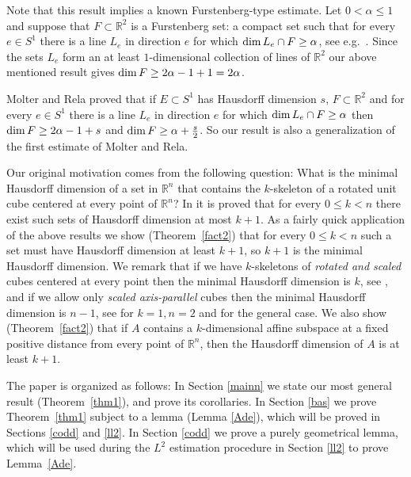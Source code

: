 \documentclass[a4paper]{amsart}
\theoremstyle{definition} \newtheorem{remark}[theorem]{Remark}
\def\rr{{\mathbb R}}
\def\R{{\mathbb R}}
\def\su{\subset}
\def\al{\alpha}
\def\dim{{\rm dim}\, }
\begin{document}
Note that this result implies a known Furstenberg-type estimate. 
Let $0 < \al \leq 1$ and suppose that $F \su \rr^2$ is a Furstenberg set: 
a compact set such that for
every $e \in S^1$ there is a line $L_e$ in direction $e$ for which 
$\dim L_e \cap F \geq \al$, see e.g.~\cite{Ma15}. 
Since the sets $L_e$ form an at least $1$-dimensional collection of lines of $\R^2$
our above mentioned result gives $\dim F \geq 2 \al - 1 + 1= 2 \al$.

Molter and Rela \cite{MR} proved that if $E\su S^1$
has Hausdorff dimension $s$,  
$F\su\R^2$ and for every $e\in S^1$ there is a line 
$L_e$ in direction $e$ for which 
$\dim L_e \cap F \geq \al$ then $\dim F\ge 2\al-1+s$ and 
$\dim F\ge \al+\frac{s}2$. So our result is also a generalization of the
first estimate of Molter and Rela.

Our original motivation comes from the following question: What is the
minimal Hausdorff dimension of a set in $\R^n$ that contains the $k$-skeleton
of a rotated unit cube centered at every point of $\R^n$? In \cite{CCHK}
it is proved that for every $0\le k <n$ there exist such sets of
Hausdorff dimension at most $k+1$. 
As a fairly quick application of the above results we show 
(Theorem~\ref{fact2}) that for every $0\le k <n$ such a set must have
Hausdorff dimension at least $k+1$, so $k+1$ is the minimal Hausdorff 
dimension. 
We remark that if we have $k$-skeletons 
of \emph{rotated and scaled} cubes centered at every point 
then the minimal Hausdorff dimension is $k$, see \cite{CCHK}, and 
if we allow only \emph{scaled axis-parallel} cubes then the minimal 
Hausdorff dimension is $n-1$, see \cite{KNS} for $k=1, n=2$ and \cite{Th}
for the general case.
We also show (Theorem~\ref{fact2}) that 
if $A$ contains a $k$-dimensional affine subspace at a fixed positive distance
from every point of $\R^n$, 
then the Hausdorff dimension of $A$ is at least $k + 1$.


The paper is organized as follows: In Section \ref{mainn} we state 
our most general result (Theorem~\ref{thm1}), and prove its corollaries. 
In Section \ref{bas} we prove Theorem~\ref{thm1} subject to a lemma 
(Lemma \ref{Ade}), which will be proved in Sections \ref{codd} and \ref{ll2}.
In Section \ref{codd} we prove a purely geometrical lemma, 
which will be used during the $\mathit{L}^2$ estimation procedure 
in Section \ref{ll2} to prove Lemma~\ref{Ade}. 
\end{document}
